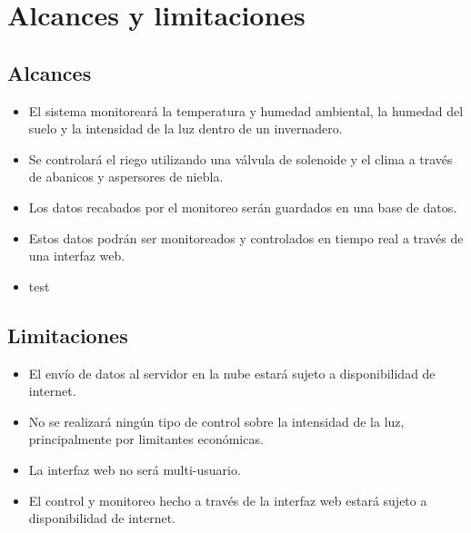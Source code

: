 \section{Alcances y limitaciones}


\subsection*{Alcances}
\begin{itemize}
    \item El sistema monitoreará la temperatura y humedad ambiental, la humedad del suelo y la intensidad de la luz dentro de un invernadero.
    \item Se controlará el riego utilizando una válvula de solenoide y el clima a través de abanicos y aspersores de niebla. 
    \item Los datos recabados por el monitoreo serán guardados en una base de datos.
    \item Estos datos podrán ser monitoreados y controlados en tiempo real a través de una interfaz web.
    \item test
\end{itemize}

\subsection*{Limitaciones}
\begin{itemize}
    \item El envío de datos al servidor en la nube estará sujeto a disponibilidad de internet.
    \item No se realizará ningún tipo de control sobre la intensidad de la luz, principalmente por limitantes económicas.
    \item La interfaz web no será multi-usuario.
    \item El control y monitoreo hecho a través de la interfaz web estará sujeto a disponibilidad de internet.
\end{itemize}
